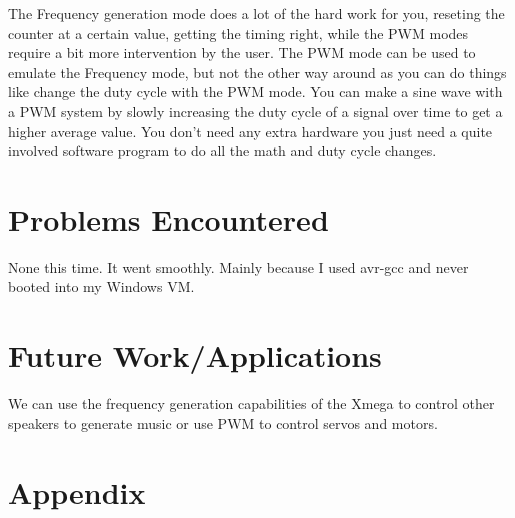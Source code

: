 \documentclass[letterpaper, 12pt]{article}
\begin{document}
\begin{enumerate}
    The Frequency generation mode does a lot of the hard work for you, reseting the counter at a certain value, getting the timing right, while the PWM modes require a bit more intervention by the user. The PWM mode can be used to emulate the Frequency mode, but not the other way around as you can do things like change the duty cycle with the PWM mode.
    You can make a sine wave with a PWM system by slowly increasing the duty cycle of a signal over time to get a higher average value. You don't need any extra hardware you just need a quite involved software program to do all the math and duty cycle changes.
\end{enumerate}
\section*{Problems Encountered}
None this time. It went smoothly. Mainly because I used avr-gcc and never
booted into my Windows VM.
\section*{Future Work/Applications}
We can use the frequency generation capabilities of the Xmega to control
other speakers to generate music or use PWM to control servos and motors.
\section*{Appendix}
\end{document}
